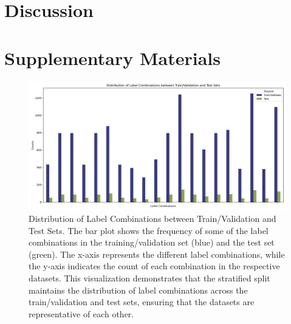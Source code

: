 \documentclass[english,11pt,a4paper,titlepage]{article}
\begin{document}
\section*{Discussion}

\newpage
\printbibliography

\clearpage
\renewcommand{\thefigure}{Supplementary \arabic{figure}}
\renewcommand{\figurename}{}
\setcounter{figure}{0}

\section*{Supplementary Materials}

\begin{figure}
	\centering
	\includegraphics[width=0.9\linewidth]{img/2018_train_val_test_split.png}
	\caption{Distribution of Label Combinations between Train/Validation and Test Sets. The bar plot shows the frequency of some of the label combinations in the training/validation set (blue) and the test set (green). The x-axis represents the different label combinations, while the y-axis indicates the count of each combination in the respective datasets. This visualization demonstrates that the stratified split maintains the distribution of label combinations across the train/validation and test sets, ensuring that the datasets are representative of each other.}
	\label{fig:multilabel_split}
\end{figure}
\end{document}
